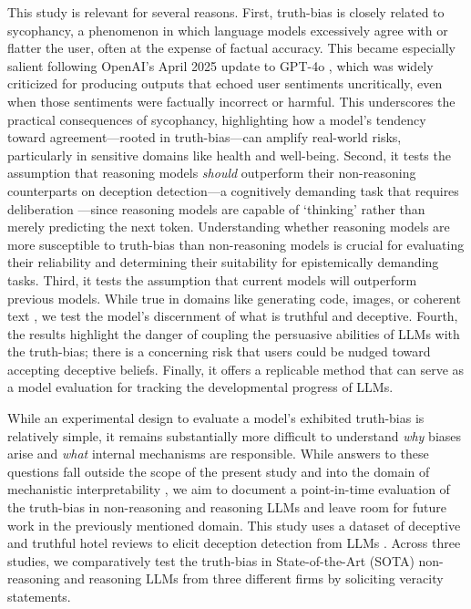 \documentclass{article}
\begin{document}
This study is relevant for several reasons. First, truth-bias is closely related to sycophancy, a phenomenon in which language models excessively agree with or flatter the user, often at the expense of factual accuracy. This became especially salient following OpenAI's April 2025 update to GPT-4o \citep{openai_sycophancy_4o_2025}, which was widely criticized for producing outputs that echoed user sentiments uncritically, even when those sentiments were factually incorrect or harmful. This underscores the practical consequences of sycophancy, highlighting how a model's tendency toward agreement---rooted in truth-bias---can amplify real-world risks, particularly in sensitive domains like health and well-being. Second, it tests the assumption that reasoning models \textit{should} outperform their non-reasoning counterparts on deception detection---a cognitively demanding task that requires deliberation \citep{mccornack_deception_1986}---since reasoning models are capable of `thinking' rather than merely predicting the next token. Understanding whether reasoning models are more susceptible to truth-bias than non-reasoning models is crucial for evaluating their reliability and determining their suitability for epistemically demanding tasks. Third, it tests the assumption that current models will outperform previous models. While true in domains like generating code, images, or coherent text \citep{handa2025economictasksperformedai, anthropic_anthropic_2025}, we test the model's discernment of what is truthful and deceptive. Fourth, the results highlight the danger of coupling the persuasive abilities of LLMs with the truth-bias; there is a concerning risk that users could be nudged toward accepting deceptive beliefs. Finally, it offers a replicable method that can serve as a model evaluation for tracking the developmental progress of LLMs.

While an experimental design to evaluate a model's exhibited truth-bias is relatively simple, it remains substantially more difficult to understand \textit{why} biases arise and \textit{what} internal mechanisms are responsible. While answers to these questions fall outside the scope of the present study and into the domain of mechanistic interpretability \citep{Nanda2023ProgressMF}, we aim to document a point-in-time evaluation of the truth-bias in non-reasoning and reasoning LLMs and leave room for future work in the previously mentioned domain. This study uses a dataset of deceptive and truthful hotel reviews \citep{ott_finding_2011} to elicit deception detection from LLMs \citep{markowitz_generative_2024}. Across three studies, we comparatively test the truth-bias in State-of-the-Art (SOTA) non-reasoning and reasoning LLMs from three different firms by soliciting veracity statements.
\end{document}
